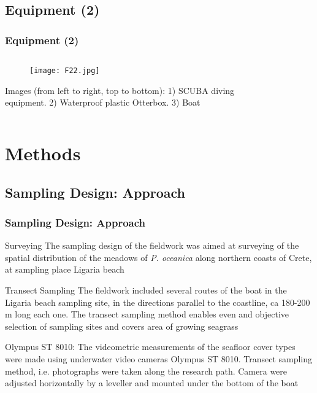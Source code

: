 \documentclass[pdflatex,compress,9pt,
	xcolor={dvipsnames,dvipsnames,svgnames,x11names,table},
	hyperref={colorlinks = true,breaklinks = true, urlcolor = NavyBlue, breaklinks = true}]{beamer}
\begin{document}
\subsection{Equipment (2)}
\begin{frame}\frametitle{Equipment (2)}
\begin{minipage}[0.4\textheight]{\textwidth}
\begin{columns}[T]
\begin{column}{0.5\textwidth}
\vspace{1em}
\begin{figure}[H]
	\centering
		\texttt{[image: F22.jpg]}
\end{figure}
\small{Images (from left to right, top to bottom): 1) \ac{SCUBA} diving equipment. 2) Waterproof plastic Otterbox. 3) Boat}
\end{column}
\begin{column}{0.5\textwidth}
\begin{figure}[H]
	\centering
			\vspace{1mm}
\end{figure}
\end{column}
\end{columns}
\end{minipage}
\end{frame}

\section{Methods}
\subsection{Sampling Design: Approach}
\begin{frame}\frametitle{Sampling Design: Approach}

\begin{alertblock}{Surveying}
The sampling design of the fieldwork was aimed at surveying of the spatial distribution of the meadows of \emph{P. oceanica} along northern coasts of Crete, at sampling place Ligaria beach
\end{alertblock}

\begin{block}{Transect Sampling}
The fieldwork included several routes of the boat in the Ligaria beach sampling site, in the directions parallel to the coastline, ca 180-200 m long each one. The transect sampling method enables even and objective selection of sampling sites and covers area of growing seagrass
\end{block}

\begin{examples}{Olympus ST 8010:}
The videometric measurements of the seafloor cover types were made using underwater video cameras Olympus ST 8010. Transect sampling method, i.e. photographs were taken along the research path. Camera were adjusted horizontally by a leveller and mounted under the bottom of the boat
\end{examples}

\end{frame}
\end{document}
